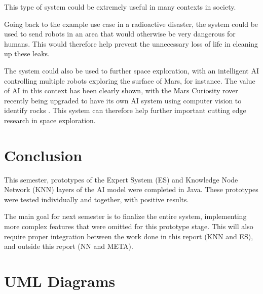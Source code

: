 \documentclass[titlepage,11pt]{article}
\begin{document}
This type of system could be extremely useful in many contexts in society.

Going back to the example use case in a radioactive disaster, the system could be used to send robots in an area that would otherwise be very dangerous for humans. This would therefore help prevent the unnecessary loss of life in cleaning up these leaks.

The system could also be used to further space exploration, with an intelligent AI controlling multiple robots exploring the surface of Mars, for instance. The value of AI in this context has been clearly shown, with the Mars Curiosity rover recently being upgraded to have its own AI system using computer vision to identify rocks \cite{rover}. This system can therefore help further important cutting edge research in space exploration.

\section{Conclusion}

This semester, prototypes of the Expert System (ES) and Knowledge Node Network (KNN) layers of the AI model were completed in Java. These prototypes were tested individually and together, with positive results.

The main goal for next semester is to finalize the entire system, implementing more complex features that were omitted for this prototype stage. This will also require proper integration between the work done in this report (KNN and ES), and outside this report (NN and META).

\clearpage
\onecolumn
\appendix

\renewcommand\thefigure{\thesection.\arabic{figure}}
\setcounter{figure}{0}    

\section{UML Diagrams}
\label{sec:uml}
\end{document}
